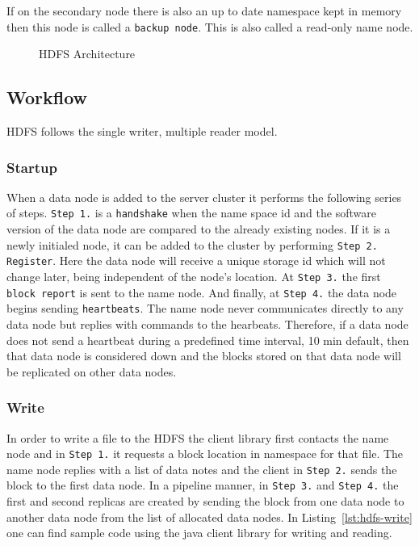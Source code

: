 \documentclass{sig-alternate}
\begin{document}
If on the secondary node there is also an up to date namespace kept in memory then this node is called a \texttt{backup node}. This is also called a read-only name node. 

\begin{figure}[!hbt]
\centering
{}
\caption{HDFS Architecture}
\label{fig:hdfs_architecture}
\end{figure}

\subsection{Workflow}
HDFS follows the single writer, multiple reader model.

\subsubsection{Startup}
When a data node is added to the server cluster it performs the following series of steps.
\texttt{Step 1.} is a \texttt{handshake} when the name space id and the software version of the data node are compared to the already existing nodes. If it is a newly initialed node, it can be added to the cluster by performing \texttt{Step 2. Register}. Here the data node will receive a unique storage id which will not change later, being independent of the node's location.
At \texttt{Step 3.} the first \texttt{block report} is sent to the name node. And finally, at \texttt{Step 4.} the data node begins sending \texttt{heartbeats}. The name node never communicates directly to any data node but replies with commands to the hearbeats. Therefore, if a data node does not send a heartbeat during a predefined time interval, 10 min default, then that data node is considered down and the blocks stored on that data node will be replicated on other data nodes.

\subsubsection{Write}
In order to write a file to the HDFS the client library first contacts the name node and in \texttt{Step 1.} it requests a block location in namespace for that file. 
The name node replies with a list of data notes and the client in \texttt{Step 2.} sends the block to the first data node.
In a pipeline manner, in \texttt{Step 3.} and \texttt{Step 4.} the first and second replicas are created by sending the block from one data node to another data node from the list of allocated data nodes. In Listing~\ref{lst:hdfs-write} one can find sample code using the java client library for writing and reading.
\end{document}
